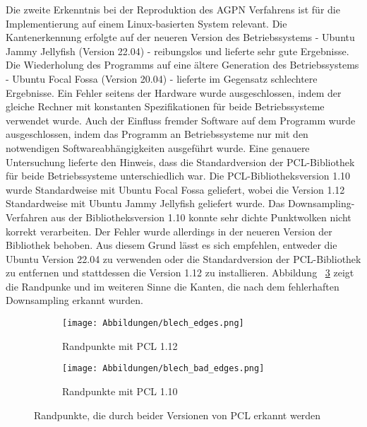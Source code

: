 Die zweite Erkenntnis bei der Reproduktion des AGPN Verfahrens ist für die Implementierung auf einem Linux-basierten System relevant. Die Kantenerkennung erfolgte auf der neueren Version des Betriebssystems - Ubuntu Jammy Jellyfish (Version 22.04) - reibungslos und lieferte sehr gute Ergebnisse. Die Wiederholung des Programms auf eine ältere Generation des Betriebssystems - Ubuntu Focal Fossa (Version 20.04) - lieferte im Gegensatz schlechtere Ergebnisse. Ein Fehler seitens der Hardware wurde ausgeschlossen, indem der gleiche Rechner mit konstanten Spezifikationen für beide Betriebssysteme verwendet wurde. Auch der Einfluss fremder Software auf dem Programm wurde ausgeschlossen, indem das Programm an Betriebssysteme nur mit den notwendigen Softwareabhängigkeiten ausgeführt wurde. Eine genauere Untersuchung lieferte den Hinweis, dass die Standardversion der PCL-Bibliothek für beide Betriebssysteme unterschiedlich war. Die PCL-Bibliotheksversion 1.10 wurde Standardweise mit Ubuntu Focal Fossa geliefert, wobei die Version 1.12 Standardweise mit Ubuntu Jammy Jellyfish geliefert wurde. Das Downsampling-Verfahren aus der Bibliotheksversion 1.10 konnte sehr dichte Punktwolken nicht korrekt verarbeiten. Der Fehler wurde allerdings in der neueren Version der Bibliothek behoben. Aus diesem Grund lässt es sich empfehlen, entweder die Ubuntu Version 22.04 zu verwenden oder die Standardversion der PCL-Bibliothek zu entfernen und stattdessen die Version 1.12 zu installieren. Abbildung ~\ref{fig: pcl_version_comparision} zeigt die Randpunke und im weiteren Sinne die Kanten, die nach dem fehlerhaften Downsampling erkannt wurden.


\begin{figure}[t]
	\centering
	\begin{subfigure}[h]{0.49\textwidth}
		\texttt{[image: Abbildungen/blech\_edges.png]}
		\centering
		\caption{Randpunkte mit PCL 1.12}
		\label{fig: blech_edges}
	\end{subfigure}
	\hfill
	\begin{subfigure}[h]{0.49\textwidth}
		\texttt{[image: Abbildungen/blech\_bad\_edges.png]}
		\centering
		\caption{Randpunkte mit PCL 1.10}
		\label{fig: bad_edges}
	\end{subfigure}
	\caption{Randpunkte, die durch beider Versionen von PCL erkannt werden}
	\label{fig: pcl_version_comparision}
\end{figure}

